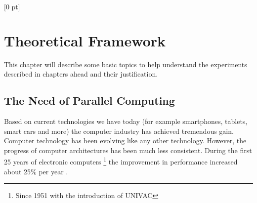 \titlespacing{\chapter}{0 pt}{30 pt}{50 pt}[0 pt]
\titleformat{\section}{\Large\bfseries}{\thesection}{0 pt}{\hspace{30 pt}}
\titleformat{\subsection}{\large\bfseries}{\thesubsection}{0 pt}{\hspace{30 pt}}
\pagestyle{fancy}
\fancyhead[LO,LE]{\footnotesize\emph{\leftmark}}
\fancyhead[RO,RE]{\thepage}
\fancyfoot[CO,CE]{}
\setcounter{secnumdepth}{5}

\chapter{Theoretical Framework}  %
\noindent

This chapter will describe some basic topics to help understand the
experiments described in chapters ahead and their justification.

\section{The Need of Parallel Computing}
\noindent

Based on current technologies we have today (for example smartphones, tablets,
smart cars and more) the computer industry has achieved tremendous gain. 
Computer technology has been evolving like any other technology.
However, the progress of computer architectures has been much less
consistent. During the first 25 years of electronic computers \footnote{Since
1951 with the introduction of UNIVAC} the improvement in performance increased
about 25\% per year \cite{Hennessy}. 

